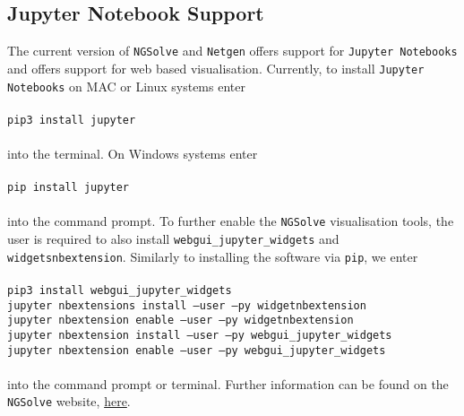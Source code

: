 \subsection{Jupyter Notebook Support}
The current version of \texttt{NGSolve} and \texttt{Netgen} offers support for \texttt{Jupyter Notebooks} and offers support for web based visualisation. Currently, to install \texttt{Jupyter Notebooks} on MAC or Linux systems enter \\
\\
\texttt{pip3 install jupyter}
\\
\\into the terminal. On Windows systems enter\\
\\
\texttt{pip install jupyter}
\\
\\into the command prompt. To further enable the \texttt{NGSolve} visualisation tools, the user is required to also install \texttt{webgui\_jupyter\_widgets} and \texttt{widgetsnbextension}. Similarly to installing the software via \texttt{pip}, we enter
\\
\\
\texttt{pip3 install webgui\_jupyter\_widgets}\\
\texttt{jupyter nbextensions install --user --py widgetnbextension}\\
\texttt{jupyter nbextension enable --user --py widgetnbextension}\\
\texttt{jupyter nbextension install --user --py webgui\_jupyter\_widgets}\\
\texttt{jupyter nbextension enable --user --py webgui\_jupyter\_widgets}
\\
\\into the command prompt or terminal. Further information can be found on the \texttt{NGSolve} website, \href{https://docu.ngsolve.org/latest/install/usejupyter.html}{here}.